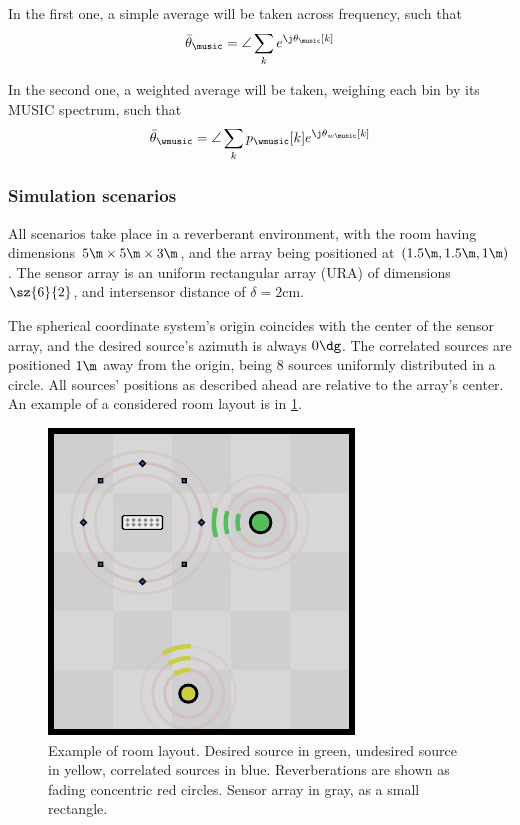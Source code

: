 In the first one, a simple average will be taken across frequency, such that
\begin{equation}
	\bar{\theta}_{\music} = \angle\sum_{k} e^{\j\theta_{\music}[k]}
\end{equation}

In the second one, a weighted average will be taken, weighing each bin by its MUSIC spectrum, such that
\begin{equation}
	\bar{\theta}_{\wmusic} = \angle\sum_{k} p_{\wmusic}[k] e^{\j\theta_{w\music}[k]}
\end{equation}

\subsubsection*{Simulation scenarios}

All scenarios take place in a reverberant environment, with the room having dimensions $5\m\times5\m\times3\m$, and the array being positioned at $(1.5\m,1.5\m,1\m)$. The sensor array is an uniform rectangular array (URA) of dimensions $\sz{6}{2}$, and intersensor distance of $\delta=2\si{\centi\meter}$.

The spherical coordinate system's origin coincides with the center of the sensor array, and the desired source's azimuth is always $0\dg$. The correlated sources are positioned $1\m$ away from the origin, being 8 sources uniformly distributed in a circle. All sources' positions as described ahead are relative to the array's center. An example of a considered room layout is in \cref{fig:room_layout}.

\begin{figure}[t]
	\centering
%	
	\includegraphics[width=0.8\linewidth]{input/drawings/sims_room_layout.pdf}
	\caption{Example of room layout. Desired source in green, undesired source in yellow, correlated sources in blue. Reverberations are shown as fading concentric red circles. Sensor array in gray, as a small rectangle.}
	\label{fig:room_layout}
\end{figure} 

